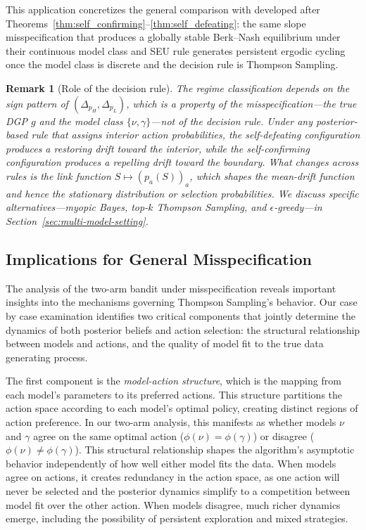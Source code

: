 \documentclass[12pt]{article}
\newtheorem{remark}{Remark}
\begin{document}
This application concretizes the general comparison with \citet{frickBeliefConvergenceMisspecified2023} developed after Theorems~\ref{thm:self_confirming}--\ref{thm:self_defeating}: the same slope misspecification that produces a globally stable Berk--Nash equilibrium under their continuous model class and SEU rule generates persistent ergodic cycling once the model class is discrete and the decision rule is Thompson Sampling.

\begin{remark}[Role of the decision rule]
\label{rem:role_decision_rule}
The regime classification depends on the sign pattern of $(\Delta_{p_H}, \Delta_{p_L})$, which is a property of the misspecification---the true DGP $g$ and the model class $\{\nu, \gamma\}$---not of the decision rule. Under any posterior-based rule that assigns interior action probabilities, the self-defeating configuration produces a restoring drift toward the interior, while the self-confirming configuration produces a repelling drift toward the boundary. What changes across rules is the \emph{link function} $S \mapsto (p_a(S))_a$, which shapes the mean-drift function and hence the stationary distribution or selection probabilities. We discuss specific alternatives---myopic Bayes, top-$k$ Thompson Sampling, and $\epsilon$-greedy---in Section~\ref{sec:multi-model-setting}.
\end{remark}

\subsection{Implications for General Misspecification}

The analysis of the two-arm bandit under misspecification reveals important insights into the mechanisms governing Thompson Sampling's behavior. Our case by case examination identifies two critical components that jointly determine the dynamics of both posterior beliefs and action selection: the structural relationship between models and actions, and the quality of model fit to the true data generating process.

The first component is the \emph{model-action structure}, which is the mapping from each model's parameters to its preferred actions. This structure partitions the action space according to each model's optimal policy, creating distinct regions of action preference. In our two-arm analysis, this manifests as whether models $\nu$ and $\gamma$ agree on the same optimal action ($\phi(\nu) = \phi(\gamma)$) or disagree ($\phi(\nu) \neq \phi(\gamma)$). This structural relationship shapes the algorithm's asymptotic behavior independently of how well either model fits the data. When models agree on actions, it creates redundancy in the action space, as one action will never be selected and the posterior dynamics simplify to a competition between model fit over the other action. When models disagree, much richer dynamics emerge, including the possibility of persistent exploration and mixed strategies.
\end{document}
